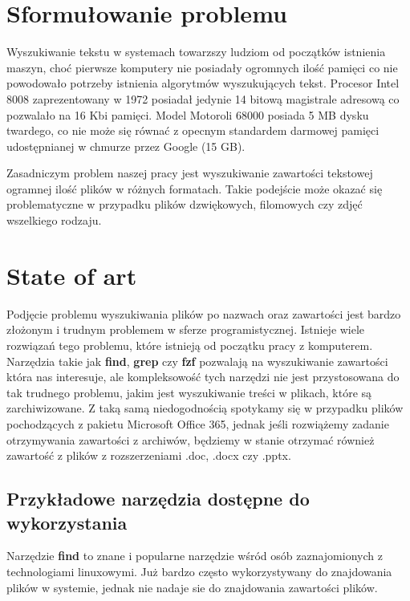 \section{Sformułowanie problemu}
Wyszukiwanie tekstu w systemach towarzszy ludziom od początków istnienia maszyn,
choć pierwsze komputery nie posiadały ogromnych ilość pamięci co nie powodowało
potrzeby istnienia algorytmów wyszukujących tekst. Procesor Intel 8008 
zaprezentowany w 1972 posiadał jedynie 14 bitową magistrale adresową co 
pozwalało na 16 Kbi pamięci. Model Motoroli 68000 posiada 5 MB dysku twardego,
co nie może się równać z opecnym standardem darmowej pamięci udostępnianej w 
chmurze przez Google (15 GB).

Zasadniczym problem naszej pracy jest wyszukiwanie zawartości tekstowej
ogramnej ilość plików w różnych formatach. Takie podejście może okazać się 
problematyczne w przypadku plików dzwiękowych, filomowych czy zdjęć wszelkiego
rodzaju.

\section{State of art}

Podjęcie problemu wyszukiwania plików po nazwach oraz zawartości jest bardzo
złożonym i trudnym problemem w sferze programistycznej. Istnieje wiele rozwiązań
tego problemu, które istnieją od początku pracy z komputerem. Narzędzia takie
jak \textbf{find}, \textbf{grep} czy \textbf{fzf} \cite{bib:internet:Fzf} pozwalają na wyszukiwanie
zawartości która nas interesuje, ale kompleksowość tych narzędzi nie jest 
przystosowana do tak trudnego problemu, jakim jest wyszukiwanie treści w plikach,
które są zarchiwizowane. Z taką samą niedogodnością spotykamy się w przypadku
plików pochodzących z pakietu Microsoft Office 365, jednak jeśli rozwiążemy 
zadanie otrzymywania zawartości z archiwów, będziemy w stanie otrzymać również 
zawartość z plików z rozszerzeniami .doc, .docx czy .pptx.

\subsection{Przykładowe narzędzia dostępne do wykorzystania}

Narzędzie \textbf{find} to znane i popularne narzędzie wśród osób zaznajomionych z
technologiami linuxowymi. Już bardzo często wykorzystywany do znajdowania plików
w systemie, jednak nie nadaje sie do znajdowania zawartości plików.

